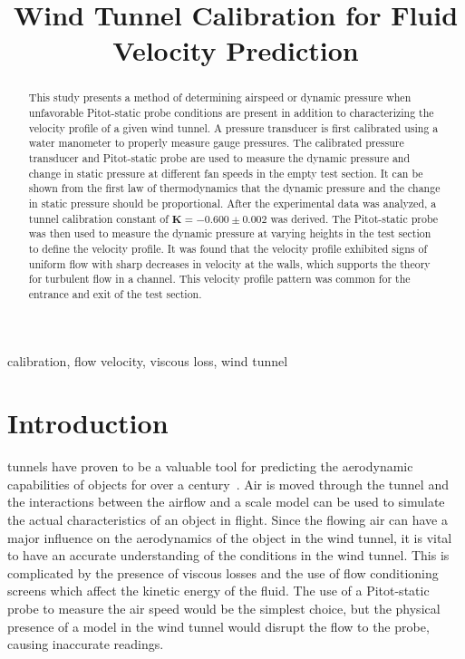 \documentclass[journal,letterpaper]{IEEEtran}
\begin{document}
\title{Wind Tunnel Calibration for Fluid Velocity Prediction}

\author{
}

\maketitle
\thispagestyle{empty}

\begin{abstract}
This study presents a method of determining airspeed or dynamic pressure when unfavorable Pitot-static probe conditions are present in addition to characterizing the velocity profile of a given wind tunnel.
A pressure transducer is first calibrated using a water manometer to properly measure gauge pressures.
The calibrated pressure transducer and Pitot-static probe are used to measure the dynamic pressure and change in static pressure at different fan speeds in the empty test section.
It can be shown from the first law of thermodynamics that the dynamic pressure and the change in static pressure should be proportional.
After the experimental data was analyzed, a tunnel calibration constant of $\bm{K = -0.600 \pm 0.002}$ was derived.
The Pitot-static probe was then used to measure the dynamic pressure at varying heights in the test section to define the velocity profile.
It was found that the velocity profile exhibited signs of uniform flow with sharp decreases in velocity at the walls, which supports the theory for turbulent flow in a channel.
This velocity profile pattern was common for the entrance and exit of the test section.
\end{abstract}

\begin{IEEEkeywords}
calibration, flow velocity, viscous loss, wind tunnel
\end{IEEEkeywords}


\section{Introduction}


 tunnels have proven to be a valuable tool for predicting the aerodynamic capabilities of objects for over a century~\cite{lecture}.
Air is moved through the tunnel and the interactions between the airflow and a scale model can be used to simulate the actual characteristics of an object in flight.
Since the flowing air can have a major influence on the aerodynamics of the object in the wind tunnel, it is vital to have an accurate understanding of the conditions in the wind tunnel.
This is complicated by the presence of viscous losses and the use of flow conditioning screens which affect the kinetic energy of the fluid.
The use of a Pitot-static probe to measure the air speed would be the simplest choice, but the physical presence of a model in the wind tunnel would disrupt the flow to the probe, causing inaccurate readings.
\end{document}
